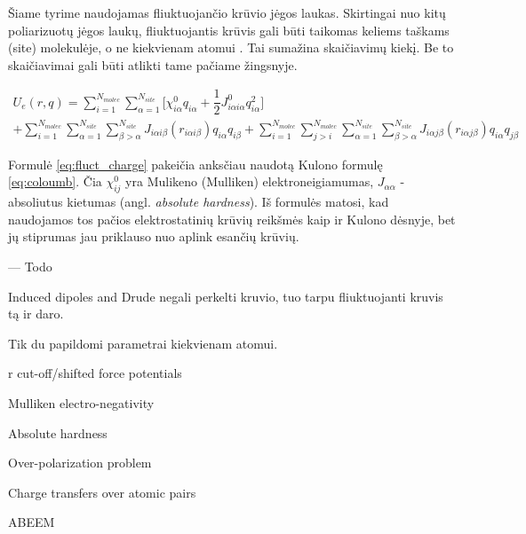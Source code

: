 Šiame tyrime naudojamas fliuktuojančio krūvio jėgos laukas.
Skirtingai nuo kitų poliarizuotų jėgos laukų, fliuktuojantis krūvis gali būti taikomas keliems taškams (site) molekulėje, o ne kiekvienam atomui \cite{polar}.
Tai sumažina skaičiavimų kiekį. Be to skaičiavimai gali būti atlikti tame pačiame žingsnyje.

\begin{multline} \label{eq:fluct_charge}
U_{e}(r, q) = \sum\limits_{i=1}^{N_{molec}} \sum\limits_{\alpha=1}^{N_{site}}
{\bigg[\chi_{i\alpha}^0 q_{i\alpha} + \dfrac{1} {2} J_{i\alpha i\alpha}^0 q_{i\alpha}^2 \bigg]} \\
+ \sum\limits_{i=1}^{N_{molec}} \sum\limits_{\alpha=1}^{N_{site}} \sum\limits_{\beta>\alpha}^{N_{site}}
{J_{i\alpha i\beta} (r_{i\alpha i\beta}) q_{i\alpha} q_{i\beta}}
+ \sum\limits_{i=1}^{N_{molec}} \sum\limits_{j>i}^{N_{molec}} \sum\limits_{\alpha=1}^{N_{site}} \sum\limits_{\beta>\alpha}^{N_{site}}
{J_{i\alpha j\beta} (r_{i\alpha j\beta}) q_{i\alpha} q_{j\beta}}
\end{multline}

Formulė \ref{eq:fluct_charge} pakeičia anksčiau naudotą Kulono formulę \ref{eq:coloumb}.
Čia \(\chi_{ij}^0\) yra Mulikeno (Mulliken) elektroneigiamumas, \(J_{\alpha\alpha}\) - absoliutus kietumas (angl. \textit{absolute hardness}).
Iš formulės matosi, kad naudojamos tos pačios elektrostatinių krūvių reikšmės kaip ir Kulono dėsnyje,
bet jų stiprumas jau priklauso nuo aplink esančių krūvių.

--- Todo

Induced dipoles and Drude negali perkelti kruvio, tuo tarpu fliuktuojanti kruvis tą ir daro.

Tik du papildomi parametrai kiekvienam atomui.

r cut-off/shifted force potentials

Mulliken electro-negativity

Absolute hardness

Over-polarization problem

Charge transfers over atomic pairs

ABEEM
